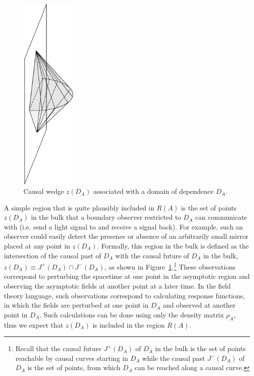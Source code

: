 \documentclass[12pt]{article}
\renewcommand{\(}{\left(}
\renewcommand{\)}{\right)}
\begin{document}
\begin{figure}
\centering
\includegraphics[width=0.24\textwidth]{zwedge-bc.eps}
\caption{Causal wedge $z(D_A)$ associated with a domain of dependence $D_A$.}
\label{zd}
\end{figure}

A simple region that is quite plausibly included in $R(A)$ is the set of points $z(D_A)$ in the bulk that a boundary observer restricted to $D_A$ can communicate with (i.e. send a light signal to and receive a signal back). For example, such an observer could easily detect the presence or absence of an arbitrarily small mirror placed at any point in $z(D_A)$. Formally, this region in the bulk is defined as the intersection of the causal past of $D_A$ with the causal future of $D_A$ in the bulk, $z(D_A) \equiv J^+(D_A) \cap J^-(D_A)$, as shown in Figure~\ref{zd}.\footnote{Recall that the causal future $J^+(D_A)$  of $D_A$ in the bulk is the set of points reachable by causal curves starting in $D_A$ while the causal past $J^-(D_A)$ of $D_A$ is the set of points, from which $D_A$ can be reached along a causal curve.} These observations correspond to perturbing the spacetime at one point in the asymptotic region and observing the asymptotic fields at another point at a later time. In the field theory language, such observations correspond to calculating response functions, in which the fields are perturbed at one point in $D_A$ and observed at another point in $D_A$. Such calculations can be done using only the density matrix $\rho_A$, thus we expect that $z(D_A)$ is included in the region $R(A)$.
\end{document}
